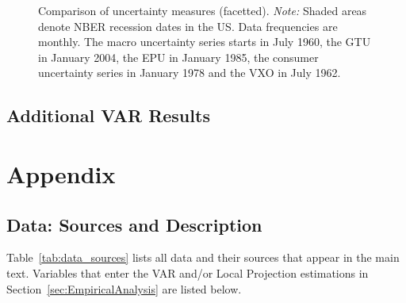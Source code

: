 \documentclass[a4paper,11pt,listof=nochaptergap,oneside,pointednumbers,bibtotoc,bigheadings,liststotoc]{scrbook}
\begin{document}
\begin{landscape}
\begin{figure}[!t]
   \centering
   \setlength\fboxsep{0pt}
   \setlength\fboxrule{0pt}
      \caption[Comparison of uncertainty measures (combined).]{Comparison of uncertainty measures (facetted).
      \textit{Note:} Shaded areas denote NBER recession dates in the US. Data frequencies are monthly. The macro uncertainty series starts in July 1960, the GTU in January 2004, the EPU in January 1985, the consumer uncertainty series in January 1978  and the VXO in July 1962.}   \label{fig:bloom_shock_all_until2016}
\end{figure}
\end{landscape}



\section{Additional VAR Results}




\chapter{Appendix}
\label{DataAndCode}
\section{Data: Sources and Description}
\label{sec:data}
Table~\ref{tab:data_sources} lists all data and their sources that appear in the main text. Variables that enter the VAR and/or Local Projection estimations in Section~\ref{sec:EmpiricalAnalysis} are listed below.
\end{document}
